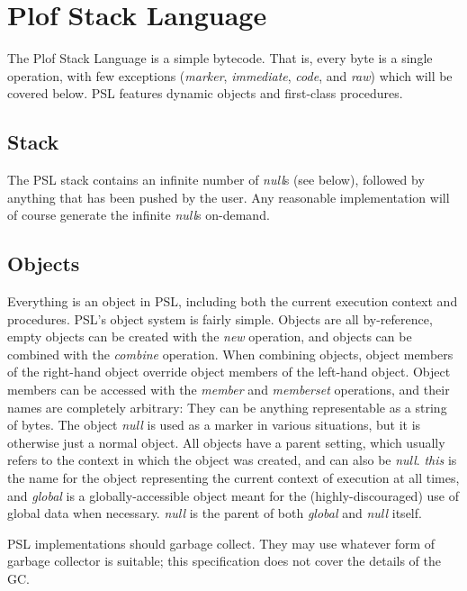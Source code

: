 \chapter{Plof Stack Language}

The Plof Stack Language is a simple bytecode. That is, every byte is a single operation, with few exceptions (\textit{marker}, \textit{immediate}, \textit{code}, and \textit{raw}) which will be covered below. PSL features dynamic objects and first-class procedures.



\section{Stack}

The PSL stack contains an infinite number of \textit{null}s (see below), followed by anything that has been pushed by the user. Any reasonable implementation will of course generate the infinite \textit{null}s on-demand.



\section{Objects}

Everything is an object in PSL, including both the current execution context and procedures. PSL's object system is fairly simple. Objects are all by-reference, empty objects can be created with the \textit{new} operation, and objects can be combined with the \textit{combine} operation. When combining objects, object members of the right-hand object override object members of the left-hand object. Object members can be accessed with the \textit{member} and \textit{memberset} operations, and their names are completely arbitrary: They can be anything representable as a string of bytes. The object \textit{null }is used as a marker in various situations, but it is otherwise just a normal object. All objects have a parent setting, which usually refers to the context in which the object was created, and can also be \textit{null}. \textit{this} is the name for the object representing the current context of execution at all times, and \textit{global} is a globally-accessible object meant for the (highly-discouraged) use of global data when necessary. \textit{null} is the parent of both \textit{global} and \textit{null} itself.

PSL implementations should garbage collect. They may use whatever form of garbage collector is suitable; this specification does not cover the details of the GC.



